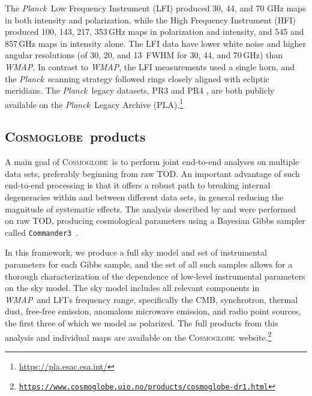 \documentclass[twocolumn]{../../common/aa}
\def\WMAP{\emph{WMAP}}
\def\Planck{\emph{Planck}}
\def\commanderthree{\texttt{Commander3}}
\newcommand{\cosmoglobe}{\textsc{Cosmoglobe}}
\newcommand{\Cosmoglobe}{\textsc{Cosmoglobe}}
\begin{document}
The \Planck\ Low Frequency Instrument (LFI) produced  30, 44, and 70 GHz maps in both intensity and polarization, while the High Frequency Instrument (HFI) produced 100, 143, 217, 353\,GHz maps in polarization and intensity, and 545 and 857\,GHz maps in intensity alone. The LFI data have lower white noise and higher angular resolutions (of 30\arcm, 20\arcm, and 13\arcm\ FWHM for 30, 44, and 70\,GHz) than \WMAP. In contrast to \WMAP, the LFI measurements used a single horn, and the \Planck\ scanning strategy followed rings closely aligned with ecliptic meridians. The \Planck\ legacy datasets, PR3 \citep{planck2016-l01} and PR4 \citep{planck2020-LVII}, are both publicly available on the \Planck\ Legacy Archive (PLA).\footnote{\url{https://pla.esac.esa.int/}}

\subsection{\Cosmoglobe\ products}
\label{sec:cosmoglobe_data}


A main goal of \Cosmoglobe\ is to perform joint end-to-end analyses on multiple data sets, preferably beginning from raw TOD. An important advantage of such end-to-end processing is that it offers a robust path to breaking internal degeneracies within and between different data sets, in general reducing the magnitude of systematic effects. The analysis described by \citet{bp01} and \citet{watts2023_dr1} were performed on raw TOD, producing cosmological parameters using a Bayesian Gibbs sampler called \commanderthree\ \citep{bp03}. %

In this framework, we produce a full sky model and set of instrumental parameters for each Gibbs sample, and the set of all such samples allows for a thorough characterization of the dependence of low-level instrumental parameters on the sky model. The sky model includes all relevant components in \WMAP\ and LFI's frequency range, specifically the CMB, synchrotron, thermal dust, free-free emission, anomalous microwave emission, and radio point sources, the first three of which we model as polarized. The full products from this analysis and individual maps are available on the \cosmoglobe\ website.\footnote{\href{https://www.cosmoglobe.uio.no/products/cosmoglobe-dr1.html}{\texttt{https://www.cosmoglobe.uio.no/products/\newline cosmoglobe-dr1.html}}}
\end{document}
